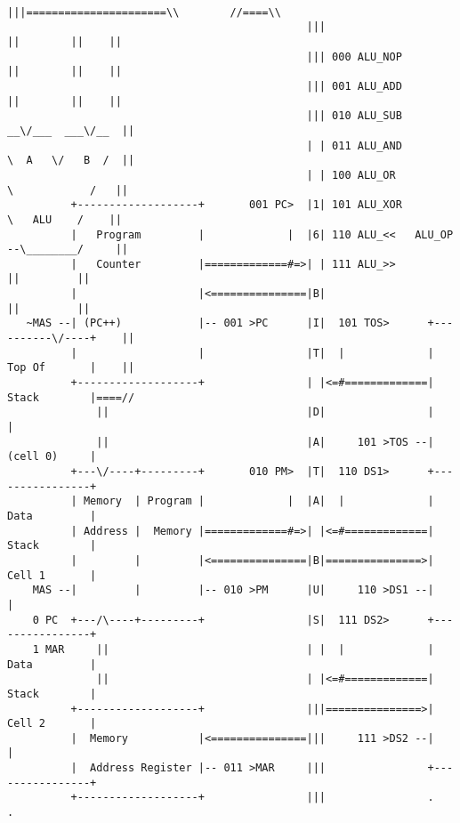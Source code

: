 \begin{figure*}[h!]
\begin{lstlisting}
                                               |||======================\\        //====\\
                                               |||                      ||        ||    ||
                                               ||| 000 ALU_NOP          ||        ||    ||
                                               ||| 001 ALU_ADD          ||        ||    ||
                                               ||| 010 ALU_SUB        __\/___  ___\/__  ||
                                               | | 011 ALU_AND        \  A   \/   B  /  ||
                                               | | 100 ALU_OR          \            /   ||
          +-------------------+       001 PC>  |1| 101 ALU_XOR          \   ALU    /    ||
          |   Program         |             |  |6| 110 ALU_<<   ALU_OP --\________/     ||
          |   Counter         |=============#=>| | 111 ALU_>>                ||         ||
          |                   |<===============|B|                           ||         ||
   ~MAS --| (PC++)            |-- 001 >PC      |I|  101 TOS>      +----------\/----+    ||
          |                   |                |T|  |             |   Top Of       |    ||
          +-------------------+                | |<=#=============|   Stack        |====//
              ||                               |D|                |                |
              ||                               |A|     101 >TOS --|   (cell 0)     |
          +---\/----+---------+       010 PM>  |T|  110 DS1>      +----------------+
          | Memory  | Program |             |  |A|  |             |   Data         |
          | Address |  Memory |=============#=>| |<=#=============|   Stack        |
          |         |         |<===============|B|===============>|   Cell 1       |
    MAS --|         |         |-- 010 >PM      |U|     110 >DS1 --|                |
    0 PC  +---/\----+---------+                |S|  111 DS2>      +----------------+
    1 MAR     ||                               | |  |             |   Data         |
              ||                               | |<=#=============|   Stack        |
          +-------------------+                |||===============>|   Cell 2       |
          |  Memory           |<===============|||     111 >DS2 --|                |
          |  Address Register |-- 011 >MAR     |||                +----------------+
          +-------------------+                |||                .                .

\end{lstlisting}
\end{figure*}
